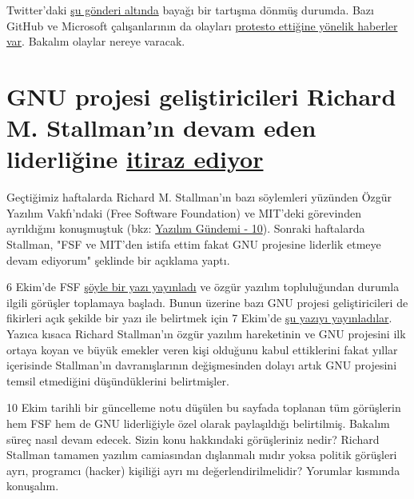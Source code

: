\documentclass[11pt]{article}
\begin{document}
Twitter'daki \href{https://mobile.twitter.com/evan\_greer/status/1181745056698572802}{şu gönderi altında} bayağı bir tartışma dönmüş durumda. Bazı GitHub
ve Microsoft çalışanlarının da olayları \href{https://www.geekwire.com/2019/microsoft-github-workers-protest-ice-contracts-latest-demonstration-employee-activism/}{protesto ettiğine yönelik haberler var}.
Bakalım olaylar nereye varacak.
\section{GNU projesi geliştiricileri Richard M. Stallman'ın devam eden liderliğine \href{https://www.zdnet.com/article/gnu-project-developers-object-to-richard-m-stallmans-continued-leadership/}{itiraz ediyor}}
\label{sec:org9710863}
Geçtiğimiz haftalarda Richard M. Stallman'ın bazı söylemleri yüzünden Özgür
Yazılım Vakfı'ndaki (Free Software Foundation) ve MIT'deki görevinden
ayrıldığını konuşmuştuk (bkz: \href{../10/yazilim-gundemi-10.pdf}{Yazılım Gündemi - 10}). Sonraki haftalarda
Stallman, "FSF ve MIT'den istifa ettim fakat GNU projesine liderlik etmeye
devam ediyorum" şeklinde bir açıklama yaptı.

6 Ekim'de FSF \href{https://www.fsf.org/news/fsf-and-gnu}{şöyle bir yazı yayınladı} ve özgür yazılım topluluğundan durumla
ilgili görüşler toplamaya başladı. Bunun üzerine bazı GNU projesi
geliştiricileri de fikirleri açık şekilde bir yazı ile belirtmek için 7 Ekim'de
\href{https://guix.gnu.org/blog/2019/joint-statement-on-the-gnu-project/}{şu yazıyı yayınladılar}. Yazıca kısaca Richard Stallman'ın özgür yazılım
hareketinin ve GNU projesini ilk ortaya koyan ve büyük emekler veren kişi
olduğunu kabul ettiklerini fakat yıllar içerisinde Stallman'ın davranışlarının
değişmesinden dolayı artık GNU projesini temsil etmediğini düşündüklerini
belirtmişler.

10 Ekim tarihli bir güncelleme notu düşülen bu sayfada toplanan tüm görüşlerin
hem FSF hem de GNU liderliğiyle özel olarak paylaşıldığı belirtilmiş. Bakalım
süreç nasıl devam edecek. Sizin konu hakkındaki görüşleriniz nedir? Richard
Stallman tamamen yazılım camiasından dışlanmalı mıdır yoksa politik görüşleri
ayrı, programcı (hacker) kişiliği ayrı mı değerlendirilmelidir? Yorumlar
kısmında konuşalım.
\end{document}
